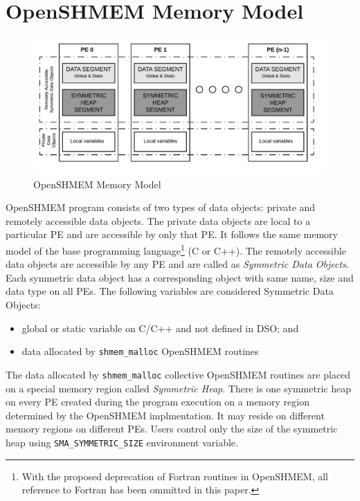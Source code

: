 \section{OpenSHMEM Memory Model}
\label{src:mmodel}
\begin{figure}[!h]
    \vspace{-30pt}
    \hspace*{5mm}
    \includegraphics[scale=0.20]{image/osm-mmodel.png}
    \vspace{-25pt}
    \caption{OpenSHMEM Memory Model}
    \vspace{-20pt}
    \label{fig:mmodel}
\end{figure}

OpenSHMEM program consists of two types of data objects: private
and remotely
accessible data objects. The private data objects are local
to a particular PE and are accessible by only that PE. It follows the
same memory model of the base programming language\footnote{With the
proposed deprecation of Fortran routines in OpenSHMEM, all reference
to Fortran has been ommitted in this paper.} (C or C++). The
remotely accessible data objects are accessible by any PE
and are called as \emph{Symmetric Data Objects}.
Each symmetric data object has a corresponding object with same %
name, size and data type on all PEs. The following variables are considered
Symmetric Data Objects:
\begin{itemize}
    \item global or static variable on C/C++ and not defined in DSO; and
    \item data allocated by \texttt{shmem\_malloc} OpenSHMEM routines
\end{itemize}

The data allocated by \texttt{shmem\_malloc} collective OpenSHMEM
routines are placed on a special memory region called \emph{Symmetric
Heap}. There is one symmetric heap on every PE created during the program
execution on a memory region determined by the OpenSHMEM implmentation.
It may reside on different memory regions on different PEs. Users
control only the size of the symmetric heap using
\texttt{SMA\_SYMMETRIC\_SIZE} environment variable.

